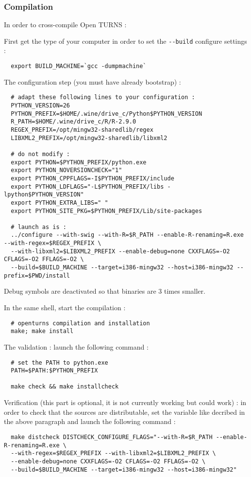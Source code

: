 \documentclass[11pt]{article}
\begin{document}
\subsubsection{Compilation}

In order to cross-compile Open TURNS :

First get the type of your computer in order to set the \verb|--build| configure settings :
\begin{verbatim}
  export BUILD_MACHINE=`gcc -dumpmachine`
\end{verbatim}

The configuration step (you must have already bootstrap) :
\begin{verbatim}
  # adapt these following lines to your configuration :
  PYTHON_VERSION=26
  PYTHON_PREFIX=$HOME/.wine/drive_c/Python$PYTHON_VERSION
  R_PATH=$HOME/.wine/drive_c/R/R-2.9.0
  REGEX_PREFIX=/opt/mingw32-sharedlib/regex
  LIBXML2_PREFIX=/opt/mingw32-sharedlib/libxml2

  # do not modify :
  export PYTHON=$PYTHON_PREFIX/python.exe
  export PYTHON_NOVERSIONCHECK="1"
  export PYTHON_CPPFLAGS=-I$PYTHON_PREFIX/include
  export PYTHON_LDFLAGS="-L$PYTHON_PREFIX/libs -lpython$PYTHON_VERSION"
  export PYTHON_EXTRA_LIBS=" "
  export PYTHON_SITE_PKG=$PYTHON_PREFIX/Lib/site-packages

  # launch as is :
  ../configure --with-swig --with-R=$R_PATH --enable-R-renaming=R.exe --with-regex=$REGEX_PREFIX \
  --with-libxml2=$LIBXML2_PREFIX --enable-debug=none CXXFLAGS=-O2 CFLAGS=-O2 FFLAGS=-O2 \
  --build=$BUILD_MACHINE --target=i386-mingw32 --host=i386-mingw32 --prefix=$PWD/install
\end{verbatim}
Debug symbols are deactivated so that binaries are 3 times smaller.

In the same shell, start the compilation :
\begin{verbatim}
  # openturns compilation and installation
  make; make install
\end{verbatim}

The validation : launch the following command :
\begin{verbatim}
  # set the PATH to python.exe
  PATH=$PATH:$PYTHON_PREFIX

  make check && make installcheck
\end{verbatim}


Verification (this part is optional, it is not currently working but could work) : in order to check that the sources are distributable, set the variable like decribed in the above paragraph and launch the following command :
\begin{verbatim}
  make distcheck DISTCHECK_CONFIGURE_FLAGS="--with-R=$R_PATH --enable-R-renaming=R.exe \
  --with-regex=$REGEX_PREFIX --with-libxml2=$LIBXML2_PREFIX \
  --enable-debug=none CXXFLAGS=-O2 CFLAGS=-O2 FFLAGS=-O2 \
  --build=$BUILD_MACHINE --target=i386-mingw32 --host=i386-mingw32"
\end{verbatim}
\end{document}
